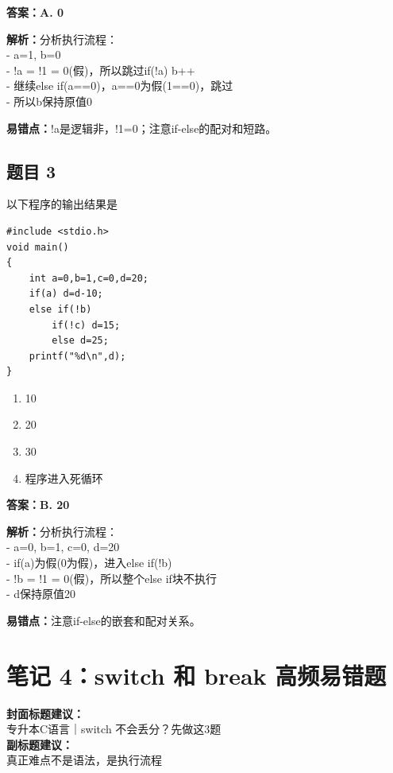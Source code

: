 \documentclass[12pt,a4paper]{ctexart}
\begin{document}
\begin{answerbox}
	\textbf{答案：A. 0}

	\textbf{解析：}分析执行流程：\\
	- a=1, b=0\\
	- !a = !1 = 0(假)，所以跳过if(!a) b++\\
	- 继续else if(a==0)，a==0为假(1==0)，跳过\\
	- 所以b保持原值0

	\textbf{易错点：}!a是逻辑非，!1=0；注意if-else的配对和短路。
\end{answerbox}

\subsection*{题目 3}
以下程序的输出结果是
\begin{lstlisting}
#include <stdio.h>
void main()
{
    int a=0,b=1,c=0,d=20;
    if(a) d=d-10;
    else if(!b)
        if(!c) d=15;
        else d=25;
    printf("%d\n",d);
}
\end{lstlisting}

\begin{enumerate}[label=\Alph*.]
	\item 10
	\item 20
	\item 30
	\item 程序进入死循环
\end{enumerate}

\begin{answerbox}
	\textbf{答案：B. 20}

	\textbf{解析：}分析执行流程：\\
	- a=0, b=1, c=0, d=20\\
	- if(a)为假(0为假)，进入else if(!b)\\
	- !b = !1 = 0(假)，所以整个else if块不执行\\
	- d保持原值20

	\textbf{易错点：}注意if-else的嵌套和配对关系。
\end{answerbox}

\newpage

\section{笔记 4：switch 和 break 高频易错题}
\begin{coverbox}
	\textbf{封面标题建议：}\\
	专升本C语言｜switch 不会丢分？先做这3题\\
	\textbf{副标题建议：}\\
	真正难点不是语法，是执行流程
\end{coverbox}
\end{document}
